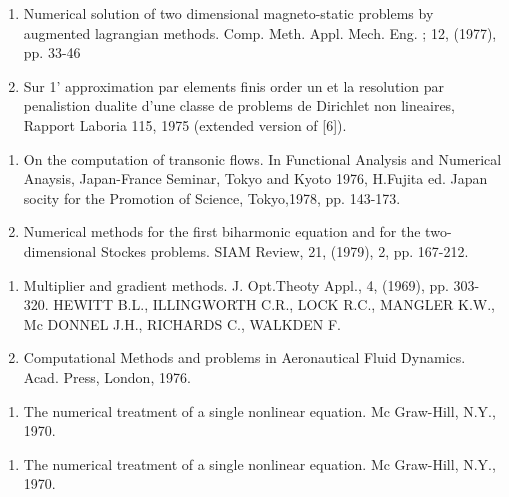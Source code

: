\begin{thebibliography}{99}
\begin{enumerate}
  \item Numerical solution of two dimensional magneto-static problems
 by augmented lagrangian methods. Comp. Meth. Appl. Mech. Eng. ;
 12, (1977), pp. 33-46\label{k54:e7} 

  \item Sur 1' approximation par elements finis order un et la
 resolution par penalistion dualite d'une classe de problems de
 Dirichlet non lineaires, Rapport Laboria 115, 1975 (extended
 version of [6]).\label{k54:e8} 
  \end{enumerate}


  \begin{enumerate}
  \item On the computation of transonic flows. In Functional Analysis
 and Numerical Anaysis, Japan-France Seminar, Tokyo and Kyoto 1976,
 H.Fujita ed. Japan socity for the Promotion of Science,
 Tokyo,1978, pp. 143-173.\label{k55:e1} 

  \item Numerical methods for the first biharmonic equation and for
 the two-dimensional Stockes problems. SIAM Review, 21, (1979), 2,
 pp. 167-212.\label{k55:e2} 
  \end{enumerate}

  \begin{enumerate}
  \item  Multiplier and gradient methods. J. Opt.Theoty Appl., 4,
 (1969), pp. 303-320. HEWITT B.L., ILLINGWORTH C.R., LOCK R.C.,
 MANGLER K.W., Mc DONNEL J.H., RICHARDS C., WALKDEN F.\label{k56:e1} 

  \item Computational Methods and problems in Aeronautical Fluid
 Dynamics. Acad. Press, London, 1976.\label{k56:e2} 
  \end{enumerate}


  \begin{enumerate}
  \item The numerical treatment of a single nonlinear equation. Mc
 Graw-Hill, N.Y., 1970.\label{k57:e1} 
  \end{enumerate}


  \begin{enumerate}
  \item The numerical treatment of a single nonlinear equation. Mc
 Graw-Hill, N.Y., 1970.\label{k58:e1} 
  \end{enumerate}


\end{thebibliography}
